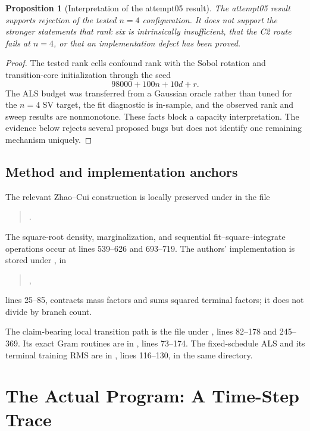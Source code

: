 \documentclass[11pt]{article}
\newtheorem{proposition}{Proposition}
\begin{document}
\begin{proposition}[Interpretation of the attempt05 result]\label{prop:decision}
The attempt05 result supports rejection of the tested $n=4$ configuration.
It does not support the stronger statements that rank six is intrinsically
insufficient, that the C2 route fails at $n=4$, or that an implementation
defect has been proved.
\end{proposition}

\begin{proof}
The tested rank cells confound rank with the Sobol rotation and transition-core
initialization through the seed
\[
98000+100n+10d+r.
\]
The ALS budget was transferred from a Gaussian oracle rather than tuned for
the $n=4$ SV target, the fit diagnostic is in-sample, and the observed rank and
sweep results are nonmonotone. These facts block a capacity interpretation.
The evidence below rejects several proposed bugs but does not identify one
remaining mechanism uniquely.
\end{proof}

\subsection{Method and implementation anchors}

The relevant Zhao--Cui construction is locally preserved under
 in the file
\begin{quote}\small
{}.
\end{quote}
The square-root density, marginalization, and sequential fit--square--integrate
operations occur at lines 539--626 and 693--719. The authors' implementation is
stored under , in
\begin{quote}\small
{},
\end{quote}
lines 25--85, contracts mass factors and sums squared terminal factors; it does
not divide by branch count.

The claim-bearing local transition path is the file
 under
, lines 82--178 and 245--369. Its exact Gram
routines are in , lines 73--174. The
fixed-schedule ALS and its terminal training RMS are in
, lines 116--130, in the same directory.

\section{The Actual Program: A Time-Step Trace}
\label{sec:actual-program}
\end{document}
